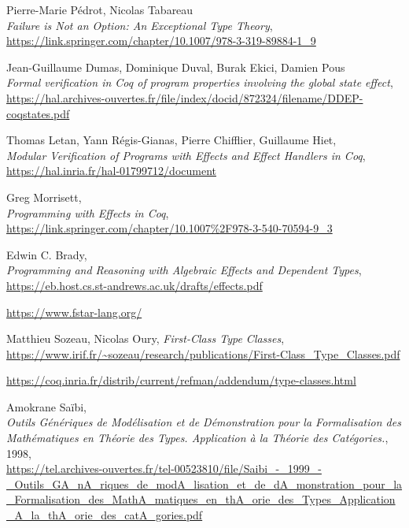 \documentclass[declaration,inz,english,shortabstract]{iithesis}
\begin{document}
\begin{thebibliography}{1}
        Pierre-Marie Pédrot, Nicolas Tabareau \\
        \textit{Failure is Not an Option: An Exceptional Type Theory}, \\
        \url{https://link.springer.com/chapter/10.1007/978-3-319-89884-1_9}

        Jean-Guillaume Dumas, Dominique Duval, Burak Ekici, Damien Pous \\
        \textit{Formal verification in Coq of program properties involving the global state effect}, \\
        \url{https://hal.archives-ouvertes.fr/file/index/docid/872324/filename/DDEP-coqstates.pdf}

        Thomas Letan, Yann Régis-Gianas, Pierre Chifflier, Guillaume Hiet, \\
        \textit{Modular Verification of Programs with Effects and Effect Handlers in Coq}, \\
        \url{https://hal.inria.fr/hal-01799712/document}

        Greg Morrisett, \\
        \textit{Programming with Effects in Coq}, \\
        \url{https://link.springer.com/chapter/10.1007%2F978-3-540-70594-9_3}

        Edwin C. Brady, \\
        \textit{Programming and Reasoning with Algebraic Effects and Dependent Types}, \\
        \url{https://eb.host.cs.st-andrews.ac.uk/drafts/effects.pdf}

        \url{https://www.fstar-lang.org/}
    
        Matthieu Sozeau, Nicolas Oury,
        \textit{First-Class Type Classes}, \\
        \url{https://www.irif.fr/~sozeau/research/publications/First-Class_Type_Classes.pdf}

        \url{https://coq.inria.fr/distrib/current/refman/addendum/type-classes.html}

        Amokrane Saïbi, \\
        \textit{Outils Génériques de Modélisation et de Démonstration pour la Formalisation des Mathématiques en Théorie des Types. Application à la Théorie des Catégories.}, 1998, \\
        \url{https://tel.archives-ouvertes.fr/tel-00523810/file/Saibi_-_1999_-_Outils_GA_nA_riques_de_modA_lisation_et_de_dA_monstration_pour_la_Formalisation_des_MathA_matiques_en_thA_orie_des_Types_Application_A_la_thA_orie_des_catA_gories.pdf}


\end{thebibliography}
\end{document}
